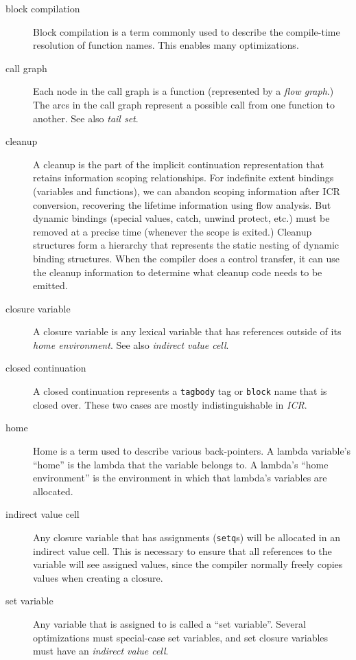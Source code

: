 \begin{description}
\item[block compilation] Block compilation is a term commonly used to describe
the compile-time resolution of function names.  This enables many
optimizations.

\item[call graph]
Each node in the call graph is a function (represented by a {\it flow graph}.)
The arcs in the call graph represent a possible call from one function to
another.  See also {\it tail set}.

\item[cleanup]
A cleanup is the part of the implicit continuation representation that
retains information scoping relationships.  For indefinite extent bindings
(variables and functions), we can abandon scoping information after ICR
conversion, recovering the lifetime information using flow analysis.  But
dynamic bindings (special values, catch, unwind protect, etc.) must be
removed at a precise time (whenever the scope is exited.)  Cleanup
structures form a hierarchy that represents the static nesting of dynamic
binding structures.  When the compiler does a control transfer, it can use
the cleanup information to determine what cleanup code needs to be emitted.

\item[closure variable]
A closure variable is any lexical variable that has references outside of
its {\it home environment}.  See also {\it indirect value cell}.

\item[closed continuation] A closed continuation represents a {\tt tagbody} tag
or {\tt block} name that is closed over.  These two cases are mostly
indistinguishable in {\it ICR}.

\item[home] Home is a term used to describe various back-pointers.  A lambda
variable's ``home'' is the lambda that the variable belongs to.  A lambda's ``home
environment'' is the environment in which that lambda's variables are allocated.

\item[indirect value cell]
Any closure variable that has assignments ({\tt setq}s) will be allocated in an
indirect value cell.  This is necessary to ensure that all references to
the variable will see assigned values, since the compiler normally freely
copies values when creating a closure.

\item[set variable] Any variable that is assigned to is called a ``set
variable''.  Several optimizations must special-case set variables, and set
closure variables must have an {\it indirect value cell}.


\end{description}
